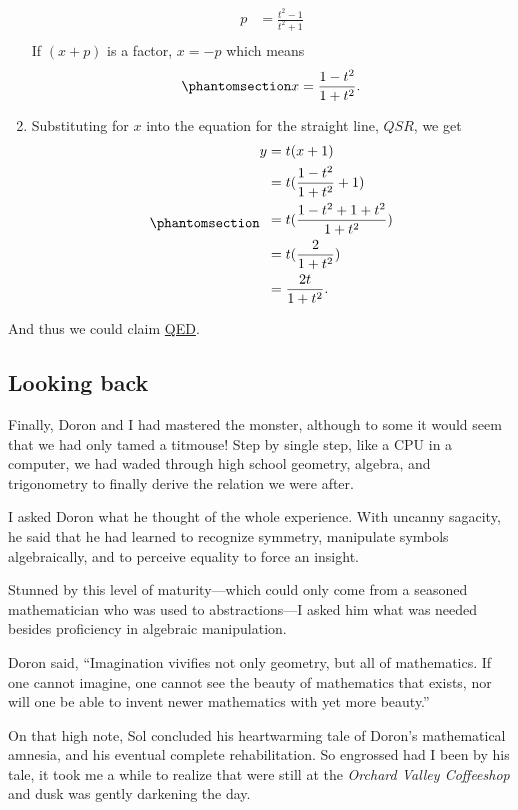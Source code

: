 \documentclass[
  a4paper,
]{article}
\begin{document}
\begin{enumerate}
\[\begin{aligned}
  p &= \frac{t^2 - 1}{t^2 + 1}\\
  \end{aligned}
  \] If \((x + p)\) is a factor, \(x = -p\) which means
  \begin{equation}\phantomsection\label{eq:forx}{
  x = \frac{1 - t^2}{1 + t^2}.
  }\end{equation}
\item
  Substituting for \(x\) into the equation for the straight line,
  \(QSR\), we get \begin{equation}\phantomsection\label{eq:fory}{
  \begin{aligned}
  y &= t(x + 1)\\
  &= t(\frac{1 - t^2}{1 + t^2} + 1)\\
  &= t(\frac{1 - t^2 + 1 + t^2}{1 + t^2})\\
  &= t(\frac{2}{1 + t^2})\\
  &= \frac{2t}{1 + t^2}.
  \end{aligned} 
  }\end{equation}
\end{enumerate}

And thus we could claim
\href{https://en.wikipedia.org/wiki/Q.E.D.}{QED}.

\subsection{Looking back}\label{looking-back}

Finally, Doron and I had mastered the monster, although to some it would
seem that we had only tamed a titmouse! Step by single step, like a CPU
in a computer, we had waded through high school geometry, algebra, and
trigonometry to finally derive the relation we were after.

I asked Doron what he thought of the whole experience. With uncanny
sagacity, he said that he had learned to recognize symmetry, manipulate
symbols algebraically, and to perceive equality to force an insight.

Stunned by this level of maturity---which could only come from a
seasoned mathematician who was used to abstractions---I asked him what
was needed besides proficiency in algebraic manipulation.

Doron said, ``Imagination vivifies not only geometry, but all of
mathematics. If one cannot imagine, one cannot see the beauty of
mathematics that exists, nor will one be able to invent newer
mathematics with yet more beauty.''

On that high note, Sol concluded his heartwarming tale of Doron's
mathematical amnesia, and his eventual complete rehabilitation. So
engrossed had I been by his tale, it took me a while to realize that
were still at the \emph{Orchard Valley Coffeeshop} and dusk was gently
darkening the day.
\end{document}
